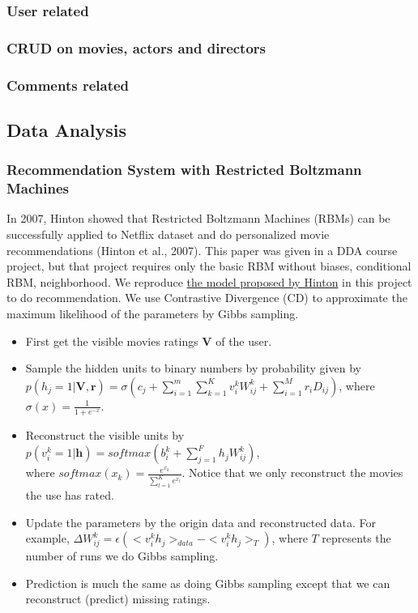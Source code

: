 \begin{CJK*}{UTF8}{gbsn}
\subsubsection{User related}
\subsubsection{CRUD on movies, actors and directors}
\subsubsection{Comments related}
\subsection{Data Analysis}
\subsubsection{Recommendation System with Restricted Boltzmann Machines}

In 2007, Hinton showed that Restricted Boltzmann Machines (RBMs) can be successfully applied to Netflix dataset and do personalized movie recommendations (Hinton et al., 2007). This paper was given in a DDA course project, but that project requires only the basic RBM without biases, conditional RBM, neighborhood. We reproduce \hyperref[RBM]{the model proposed by Hinton} in this project to do recommendation. We use Contrastive Divergence (CD) to approximate the maximum likelihood of the parameters by Gibbs sampling.
\begin{itemize}
    \item First get the visible movies ratings $ \bm{V} $ of the user.
    \item Sample the hidden units to binary numbers by probability given by \\ $ p(h_j = 1 | \bm{V}, \bm{r}) = \sigma(c_j + \sum_{i = 1}^m \sum_{k = 1}^K v_i^k W_{ij}^k + \sum_{i = 1}^M r_i D_{ij}) $, where $ \sigma(x) = \frac{1}{1 + e^{-x}}  $.
    \item Reconstruct the visible units by $ p(v_i^k = 1 | \bm{h}) = softmax(b_i^k + \sum_{j = 1}^F h_j W_{ij}^k) $, \\where $ softmax(x_k) = \frac{e^{x_k}}{\sum_{l= 1}^K e^{x_l}} $. Notice that we only reconstruct the movies the use has rated.
    \item Update the parameters by the origin data and reconstructed data. For example, $ \Delta W_{ij}^k = \epsilon (<v_i^k h_j>_{data} - <v_i^k h_j>_T) $, where $ T $ represents the number of runs we do Gibbs sampling.
    \item Prediction is much the same as doing Gibbs sampling except that we can reconstruct (predict) missing ratings.
\end{itemize}


\end{CJK*}
